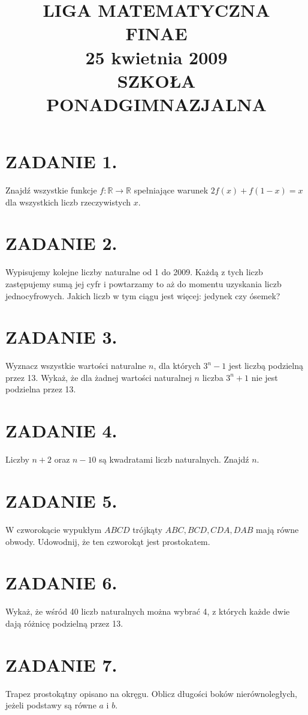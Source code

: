 \documentclass[10pt]{article}
\title{LIGA MATEMATYCZNA \\
 FINAE \\
 25 kwietnia 2009 \\
 SZKOŁA PONADGIMNAZJALNA }
\author{}
\date{}
\begin{document}
\maketitle
\section*{ZADANIE 1.}
Znajdź wszystkie funkcje \(f: \mathbb{R} \rightarrow \mathbb{R}\) spełniające warunek \(2 f(x)+f(1-x)=x\) dla wszystkich liczb rzeczywistych \(x\).

\section*{ZADANIE 2.}
Wypisujemy kolejne liczby naturalne od 1 do 2009. Każdą z tych liczb zastępujemy sumą jej cyfr i powtarzamy to aż do momentu uzyskania liczb jednocyfrowych. Jakich liczb w tym ciągu jest więcej: jedynek czy ósemek?

\section*{ZADANIE 3.}
Wyznacz wszystkie wartości naturalne \(n\), dla których \(3^{n}-1\) jest liczbą podzielną przez 13. Wykaż, że dla żadnej wartości naturalnej \(n\) liczba \(3^{n}+1\) nie jest podzielna przez 13.

\section*{ZADANIE 4.}
Liczby \(n+2\) oraz \(n-10\) są kwadratami liczb naturalnych. Znajdź \(n\).

\section*{ZADANIE 5.}
W czworokącie wypukłym \(A B C D\) trójkąty \(A B C, B C D, C D A, D A B\) mają równe obwody. Udowodnij, że ten czworokąt jest prostokatem.

\section*{ZADANIE 6.}
Wykaż, że wśród 40 liczb naturalnych można wybrać 4, z których każde dwie dają różnicę podzielną przez 13.

\section*{ZADANIE 7.}
Trapez prostokątny opisano na okręgu. Oblicz długości boków nierównoległych, jeżeli podstawy są równe \(a\) i \(b\).
\end{document}
